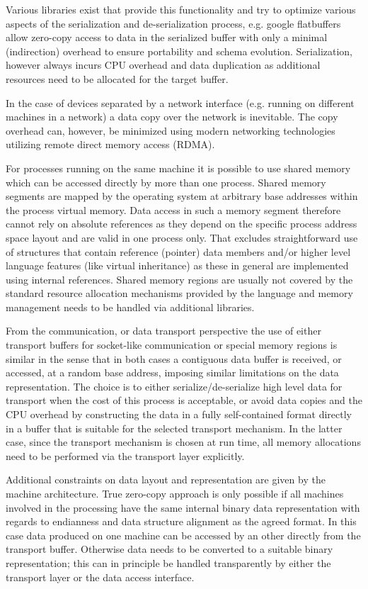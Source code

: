 \documentclass[a4paper,twoside]{article}
\begin{document}
Various libraries exist that provide this functionality and try to optimize various aspects of the serialization and de-serialization process, e.g. google flatbuffers\cite{flatbuffers} allow zero-copy access to data in the serialized buffer with only a minimal (indirection) overhead to ensure portability and schema evolution. Serialization, however always incurs CPU overhead and data duplication as additional resources need to be allocated for the target buffer.

In the case of devices separated by a network interface (e.g. running on different machines in a network) a data copy over the network is inevitable. The copy overhead can, however, be minimized using modern networking technologies utilizing remote direct memory access (RDMA).

For processes running on the same machine it is possible to use shared memory which can be accessed directly by more than one process. 
Shared memory segments are mapped by the operating system at arbitrary base addresses within the process virtual memory. Data access in such a memory segment therefore cannot rely on absolute references as they depend on the specific process address space layout and are valid in one process only.
That excludes straightforward use of structures that contain reference (pointer) data members and/or higher level language features (like virtual inheritance) as these in general are implemented using internal references. 
Shared memory regions are usually not covered by the standard resource allocation mechanisms provided by the language and memory management needs to be handled via additional libraries.

From the communication, or data transport perspective the use of either transport buffers for socket-like communication or special memory regions is similar in the sense that in both cases a contiguous data buffer is received, or accessed, at a random base address, imposing similar limitations on the data representation.
The choice is to either serialize/de-serialize high level data for transport when the cost of this process is acceptable, or avoid data copies and the CPU overhead by constructing the data in a fully self-contained format directly in a buffer that is suitable for the selected transport mechanism. In the latter case, since the transport mechanism is chosen at run time, all memory allocations need to be performed via the transport layer explicitly.

Additional constraints on data layout and representation are given by the machine architecture. True zero-copy approach is only possible if all machines involved in the processing have the same internal binary data representation with regards to endianness and data structure alignment as the agreed format. In this case data produced on one machine can be accessed by an other directly from the transport buffer. Otherwise data needs to be converted to a suitable binary representation; this can in principle be handled transparently by either the transport layer or the data access interface.
\end{document}

